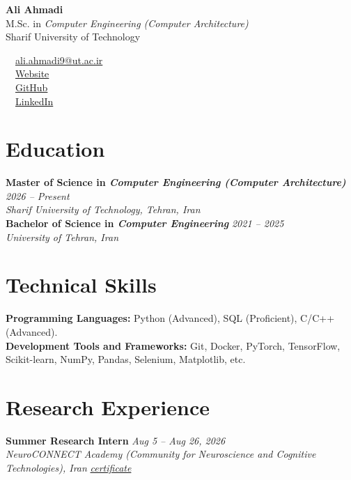 \documentclass[10.5pt, letterpaper]{article}
\newcommand{\cvEntry}[4]{
  \noindent\textbf{#1} \hfill \textit{#2}\\
  \noindent\textit{#3} \hfill #4\\[0.15em]
}
\newcommand{\cvEntrySimple}[2]{
  \noindent\textbf{#1} \hfill \textit{#2}\\
}
\begin{document}
\begin{minipage}[t]{0.62\textwidth}
    {\headingfont\LARGE \bfseries\color{accent} Ali Ahmadi}\\[0.15em]
    {\normalsize M.Sc. in \textit{Computer Engineering (Computer Architecture)}}\\[0.1em]
    {\normalsize Sharif University of Technology}
\end{minipage}
\hfill
\begin{minipage}[t]{0.35\textwidth}
    \raggedleft
    \small
    \textbullet\ \ \href{mailto:ali.ahmadi9@ut.ac.ir}{ali.ahmadi9@ut.ac.ir} \\[0.2em]
    \textbullet\ \ \href{https://0ahmadi.github.io}{Website} \\[0.2em]
    \textbullet\ \ \href{https://github.com/0ahmadi}{GitHub} \\[0.2em]
    \textbullet\ \ \href{https://www.linkedin.com/in/aliahmdif}{LinkedIn}
\end{minipage}

\vspace{0.3em}
\section{Education}

\cvEntry{Master of Science in \textit{Computer Engineering (Computer Architecture)}}{2026 -- Present}{Sharif University of Technology, Tehran, Iran}{}
\cvEntry{Bachelor of Science in \textit{Computer Engineering}}{2021 -- 2025}{University of Tehran, Iran}{}
\section{Technical Skills}

\textbf{Programming Languages:} Python (Advanced), SQL (Proficient), C/C++ (Advanced).\\[0.3em]
\textbf{Development Tools and Frameworks:} Git, Docker, PyTorch, TensorFlow, Scikit-learn, NumPy, Pandas, Selenium, Matplotlib, etc.
\section{Research Experience}

\cvEntrySimple{Summer Research Intern}{Aug 5 -- Aug 26, 2026}

\textit{NeuroCONNECT Academy (Community for Neuroscience and Cognitive Technologies), Iran} \href{https://lets-connect.org/cert.html?id=NC2026-FCNJ-8BX5}{\textit{certificate}}
\end{document}
